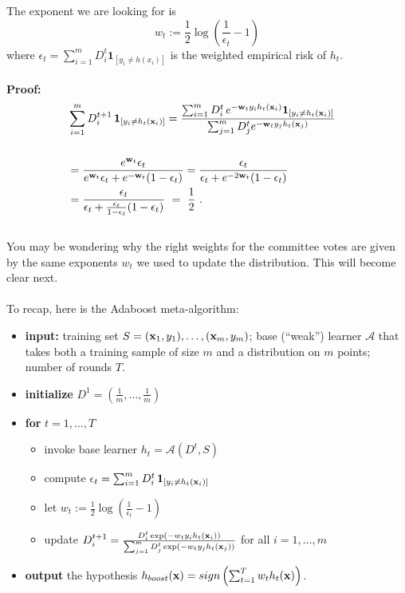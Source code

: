 \documentclass[11pt]{article}
\newcommand{\Ac}{\mathcal{A}}
\begin{document}
\\~\\
The exponent we are looking for is
\[
  w_t := \frac{1}{2}\log\left( \frac{1}{\epsilon_t} -1 \right)
\]
where $ \epsilon_t = \sum_{i=1}^m D^t_i\mathbf{1}_{[y_i \neq h(x_i)]} $ is the
weighted empirical risk of $h_t$.
\\~\\
{\bf Proof:} \begin{align*}
  &\sum_{i=1}^m D^{t+1}_i \, \mathbf{1}_{[y_i \neq h_t({\mathbf x}_i)]}  =  \frac{ \sum_{i=1}^m
	D^t_i \, e^{-{\mathbf w}_ty_ih_t({\mathbf x}_i)}
      \mathbf{1}_{[y_i \neq h_t({\mathbf x}_i)]} }{\sum_{j=1}^{m}D^t_j e^{-{\mathbf w}_t
    y_jh_t({\mathbf x}_j)} }\\
&\\ 
&=  \frac{ e^{{\mathbf w}_t} \epsilon_t }{e^{{\mathbf w}_t} \epsilon_t  + e^{-{\mathbf w}_t}
  (1-\epsilon_t ) } =  \frac{  \epsilon_t }{ \epsilon_t + e^{-2{\mathbf w}_t}
  (1-\epsilon_t) }
&\\ 
&=  \frac{  \epsilon_t }{ \epsilon_t +
  \frac{\epsilon_t}{1-\epsilon_t} (1-\epsilon_t) } ~=~ \frac{1}{2}~. 
\end{align*}
~\\
You may be wondering why the right weights for the committee votes are given by
the same exponents $w_t$ we used to update the distribution. This will become
clear next.
\\
~\\
To recap, here is the Adaboost meta-algorithm:
\begin{itemize}
\item \textbf{input:} training set $S=({\mathbf x}_1,y_1),\ldots,({\mathbf x}_m,y_m)$;
  base (``weak'') learner $\Ac$ that takes both a training sample of size $m$ and a
  distribution on $m$ points; number of rounds $T$.
\item \textbf{initialize} $D^1= (\frac{1}{m},\ldots,\frac{1}{m})$
\item \textbf{for} $t=1,\ldots,T$
\begin{itemize}
\item   invoke base learner $h_t = \Ac(D^t,S)$
\item compute $\epsilon_t = \sum_{i=1}^m D^t_i
  \, \mathbf{1}_{[y_i \neq h_t({\mathbf x}_i)]} $ 
\item let $w_t:=\frac{1}{2}\log\left(\frac{1}{\epsilon_t}-1\right)$
\item update $D^{t+1}_i = \frac{D^t_i
    \exp(-w_ty_ih_t({\mathbf x}_i))}{\sum_{j=1}^{m}D^t_j\exp(-w_t
    y_jh_t({\mathbf x}_j))}$
  for all $i=1,\ldots,m$ 
\end{itemize}
\item \textbf{output} the hypothesis $h_{boost}({\mathbf x})=sign\left(\sum_{t=1}^{T} w_t
    h_t({\mathbf x})\right)$.
\end{itemize}
\end{document}
